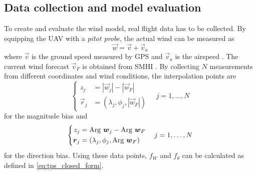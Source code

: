 \subsection{Data collection and model evaluation}
To create and evaluate the wind model, real flight data has to be collected. By equipping the UAV with a \textit{pitot probe}, the actual wind can be measured as
\begin{equation}
    \vec{w}=\vec{v} + \vec{v}_a
\end{equation}
where $\vec{v}$ is the ground speed measured by GPS and $\vec{v}_a$ is the airspeed \cite{spline_trajectory}. The current wind forecast $\vec{v}_F$ is obtained from SMHI \cite{smhi}. By collecting $N$ measurements from different coordinates and wind conditions, the interpolation points are
\begin{equation}
    \left\{
    \begin{aligned}
        z_{j}&=|\vec{w}_j| - |\vec{w}_F| \\
        \vec{r}_{j}&=(\lambda_j,\phi_j,|\vec{w}_F|)
    \end{aligned}
    \right.
    \quad j=1,\ldots,N
\end{equation}
for the magnitude bias and
\begin{equation}
    \left\{
    \begin{aligned}
        z_{j}&=\mathrm{Arg}~\boldsymbol{w}_j - \mathrm{Arg}~\boldsymbol{w}_F \\
        \boldsymbol{r}_{j}&=(\lambda_j,\phi_j,\mathrm{Arg}~\boldsymbol{w}_F)
    \end{aligned}
    \right.
    \quad j=1,\ldots,N
\end{equation}
for the direction bias. Using these data points, $f_W$ and $f_\theta$ can be calculated as defined in \eqref{eq:tps_closed_form}.